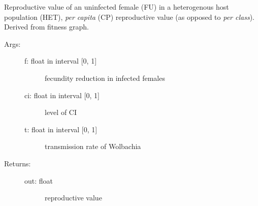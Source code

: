\documentclass[letterpaper,10pt,english]{sphinxmanual}
\begin{document}
\begin{fulllineitems}
\label{index:wspec.analytical.reproval_FUHETCP}
Reproductive value of an uninfected female (FU) in a 
heterogenous host population (HET), \emph{per capita} (CP) reproductive 
value (as opposed to \emph{per class}). Derived from fitness graph.
\begin{description}
\item[{Args:}] \leavevmode\begin{description}
\item[{f: float in interval {[}0, 1{]}}] \leavevmode
fecundity reduction in infected females

\item[{ci: float in interval {[}0, 1{]}}] \leavevmode
level of CI

\item[{t: float in interval {[}0, 1{]}}] \leavevmode
transmission rate of Wolbachia

\end{description}

\item[{Returns:}] \leavevmode\begin{description}
\item[{out: float}] \leavevmode
reproductive value

\end{description}

\end{description}

\end{fulllineitems}

\end{document}
